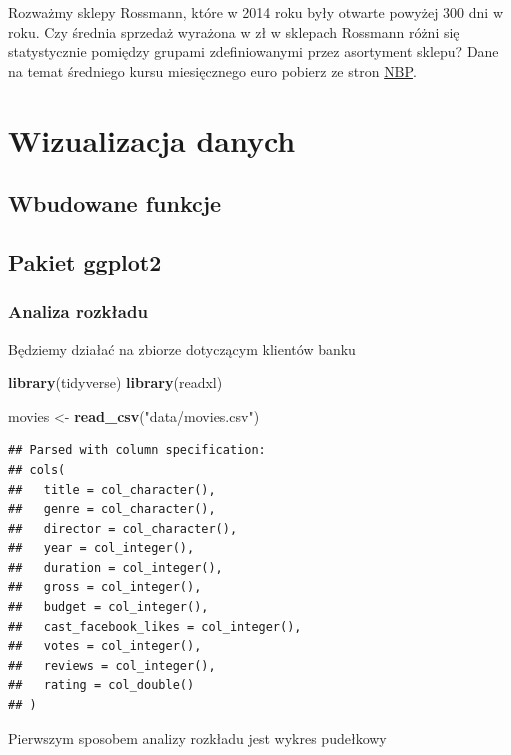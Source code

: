 \documentclass[]{book}
\newenvironment{Shaded}{\begin{snugshade}}{\end{snugshade}}
\newcommand{\KeywordTok}[1]{\textcolor[rgb]{0.13,0.29,0.53}{\textbf{#1}}}
\newcommand{\StringTok}[1]{\textcolor[rgb]{0.31,0.60,0.02}{#1}}
\newcommand{\NormalTok}[1]{#1}
\begin{document}
Rozważmy sklepy Rossmann, które w 2014 roku były otwarte powyżej 300 dni
w roku. Czy średnia sprzedaż wyrażona w zł w sklepach Rossmann różni się
statystycznie pomiędzy grupami zdefiniowanymi przez asortyment sklepu?
Dane na temat średniego kursu miesięcznego euro pobierz ze stron
\href{http://www.nbp.pl/home.aspx?f=/kursy/arch_a.html}{NBP}.

\chapter{Wizualizacja danych}\label{wizualizacja-danych}

\section{Wbudowane funkcje}\label{wbudowane-funkcje}

\section{Pakiet ggplot2}\label{pakiet-ggplot2}

\subsection{Analiza rozkładu}\label{analiza-rozkadu}

Będziemy działać na zbiorze dotyczącym klientów banku

\begin{Shaded}
\begin{Highlighting}[]
\KeywordTok{library}\NormalTok{(tidyverse)}
\KeywordTok{library}\NormalTok{(readxl)}

\NormalTok{movies <-}\StringTok{ }\KeywordTok{read_csv}\NormalTok{(}\StringTok{"data/movies.csv"}\NormalTok{)}
\end{Highlighting}
\end{Shaded}

\begin{verbatim}
## Parsed with column specification:
## cols(
##   title = col_character(),
##   genre = col_character(),
##   director = col_character(),
##   year = col_integer(),
##   duration = col_integer(),
##   gross = col_integer(),
##   budget = col_integer(),
##   cast_facebook_likes = col_integer(),
##   votes = col_integer(),
##   reviews = col_integer(),
##   rating = col_double()
## )
\end{verbatim}

Pierwszym sposobem analizy rozkładu jest wykres pudełkowy
\end{document}
